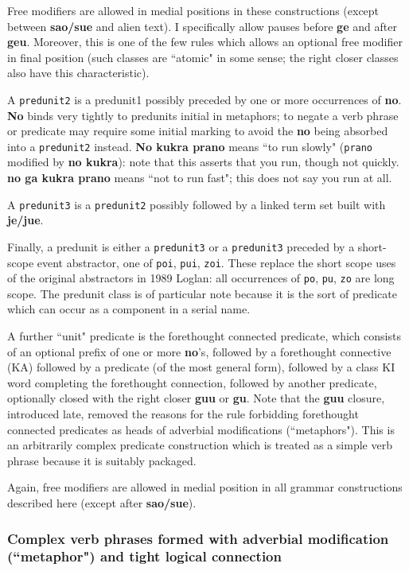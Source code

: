 \documentclass[12pt]{book}
\begin{document}
Free modifiers are allowed in medial positions in these constructions (except between {\bf sao/sue} and alien text).  I specifically allow pauses before {\bf ge} and after {\bf geu}.  Moreover, this is
one of the few rules which allows an optional free modifier in final position (such classes are ``atomic" in some sense; the right closer classes also have this characteristic).

A {\tt predunit2} is a predunit1 possibly preceded by one or more occurrences of {\bf no}.  {\bf No} binds very tightly to predunits initial in metaphors;  to negate a verb phrase or predicate may require some initial marking to avoid the {\bf no} being absorbed into a {\tt predunit2} instead.  {\bf No kukra prano}
means ``to run slowly" ({\tt prano} modified by {\bf no kukra}):  note that this asserts that you run, though not quickly.  {\bf no ga kukra prano}
means ``not to run fast";  this does not say you run at all.

A {\tt predunit3} is a {\tt predunit2} possibly followed by a linked term set built with {\bf je/jue}.

Finally, a predunit is either a {\tt predunit3} or a {\tt predunit3} preceded by a short-scope event abstractor, one of {\tt poi}, {\tt pui}, {\tt zoi}.
These replace the short scope uses of the original abstractors in 1989 Loglan:  all occurrences of {\tt po}, {\tt pu}, {\tt zo} are long scope.  The predunit class is of particular note because it is the sort of predicate which can occur as a component in a serial name.

A further ``unit" predicate is the forethought connected predicate, which consists of an optional prefix of one or more {\bf no}'s, followed
by a forethought connective (KA) followed by a predicate (of the most general form), followed by a class KI word completing the forethought connection, followed by another predicate, optionally closed with the right closer {\bf guu} or {\bf gu}.  Note that the {\bf guu} closure, introduced late, removed the reasons for the rule forbidding forethought connected predicates as heads of adverbial modifications (``metaphors").  This is an arbitrarily complex predicate construction which is treated as a simple verb phrase because it is suitably packaged.

Again, free modifiers are allowed in medial position in all grammar constructions described here (except after {\bf sao/sue}).

\subsubsection{Complex verb phrases formed with adverbial modification (``metaphor") and tight logical connection}
\end{document}
